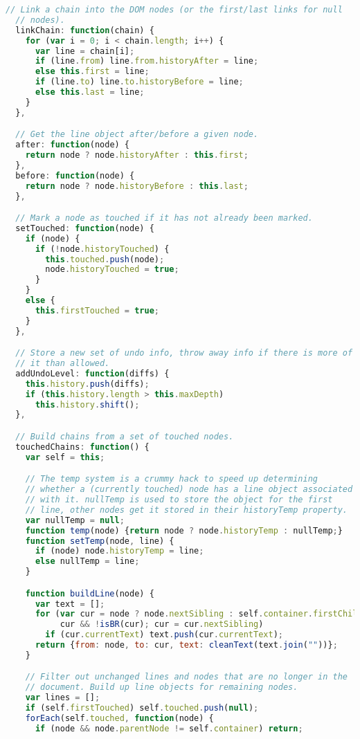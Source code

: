 \begin{lstlisting}[language=Javascript]
  // Link a chain into the DOM nodes (or the first/last links for null
  // nodes).
  linkChain: function(chain) {
    for (var i = 0; i < chain.length; i++) {
      var line = chain[i];
      if (line.from) line.from.historyAfter = line;
      else this.first = line;
      if (line.to) line.to.historyBefore = line;
      else this.last = line;
    }
  },

  // Get the line object after/before a given node.
  after: function(node) {
    return node ? node.historyAfter : this.first;
  },
  before: function(node) {
    return node ? node.historyBefore : this.last;
  },

  // Mark a node as touched if it has not already been marked.
  setTouched: function(node) {
    if (node) {
      if (!node.historyTouched) {
        this.touched.push(node);
        node.historyTouched = true;
      }
    }
    else {
      this.firstTouched = true;
    }
  },

  // Store a new set of undo info, throw away info if there is more of
  // it than allowed.
  addUndoLevel: function(diffs) {
    this.history.push(diffs);
    if (this.history.length > this.maxDepth)
      this.history.shift();
  },

  // Build chains from a set of touched nodes.
  touchedChains: function() {
    var self = this;

    // The temp system is a crummy hack to speed up determining
    // whether a (currently touched) node has a line object associated
    // with it. nullTemp is used to store the object for the first
    // line, other nodes get it stored in their historyTemp property.
    var nullTemp = null;
    function temp(node) {return node ? node.historyTemp : nullTemp;}
    function setTemp(node, line) {
      if (node) node.historyTemp = line;
      else nullTemp = line;
    }

    function buildLine(node) {
      var text = [];
      for (var cur = node ? node.nextSibling : self.container.firstChild;
           cur && !isBR(cur); cur = cur.nextSibling)
        if (cur.currentText) text.push(cur.currentText);
      return {from: node, to: cur, text: cleanText(text.join(""))};
    }

    // Filter out unchanged lines and nodes that are no longer in the
    // document. Build up line objects for remaining nodes.
    var lines = [];
    if (self.firstTouched) self.touched.push(null);
    forEach(self.touched, function(node) {
      if (node && node.parentNode != self.container) return;


\end{lstlisting}
